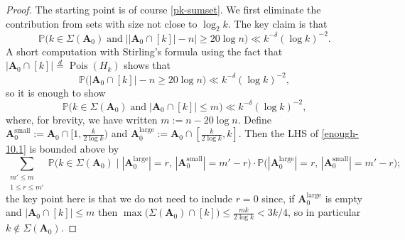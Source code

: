 \documentclass[11pt,reqno]{amsart}
\numberwithin{equation}{section}
\theoremstyle{definition}
\theoremstyle{remark}
\newcommand{\mb}{\mathbb}
\newcommand{\mbf}{\mathbf}
\newcommand\Pois{\operatorname{Pois}}
\renewcommand{\le}{\leqslant}
\renewcommand{\ge}{\geqslant}
\def\sml{\operatorname{small}}
\def\lrg{\operatorname{large}}
\newcommand\samedist{\overset{d}{=}}
\begin{document}
\begin{proof}
The starting point is of course \cref{pk-sumset}. We first eliminate the contribution from sets with size not close to $\log_2 k$. The key claim is that 
\begin{equation}\label{lemma6.1} \mb{P}\big(k \in \Sigma(\mbf{A}_0) \; \mbox{and} \; \big| |\mbf{A}_0 \cap [k]| - n\big| \ge 20 \log n \big) \ll k^{-\delta} (\log k)^{-2} .\end{equation}
A short computation with Stirling's formula using the fact that $|\mbf{A}_0 \cap [k]| \samedist \Pois(H_k)$ shows that 
\[ \mb{P}\big( |\mbf{A}_0 \cap [k]| - n  \ge 20 \log n \big) \ll k^{-\delta} (\log k)^{-2} ,\] so it is enough to show 
\begin{equation}\label{enough-10.1} \mb{P}\big(k \in \Sigma(\mbf{A}_0) \; \mbox{and} \; |\mbf{A}_0 \cap [k]| \le  m \big) \ll k^{-\delta} (\log k)^{-2},\end{equation} where, for brevity, we have written $m := n - 20 \log n$. Define $\mbf{A}_0^{\sml} := \mbf{A}_0 \cap [1,\frac{k}{2\log k})$ and $\mbf{A}_0^{\lrg} := \mbf{A}_0 \cap [\frac{k}{2\log k},k]$. Then the LHS of \cref{enough-10.1} is bounded above by
\begin{equation}\label{int-10.2} \sum_{\substack{m' \le m \\ 1 \le r \le m'}} \mb{P}\big(k \in \Sigma(\mbf{A}_0) \mid |\mbf{A}_0^{\lrg}| = r,\, |\mbf{A}_0^{\sml}| = m' - r \big) \cdot \mb{P} \big(|\mbf{A}_0^{\lrg}| = r,\, |\mbf{A}_0^{\sml}| = m' - r \big); \end{equation} the key point here is that we do not need to include $r = 0$ since, if $\mbf{A}_0^{\lrg}$ is empty and $|\mbf{A}_0 \cap [k]| \le  m$ then $\max \big(\Sigma(\mbf{A}_0) \cap [k]\big) \le \frac{mk}{2\log k} < 3k/4$, so in particular $k \notin \Sigma(\mbf{A}_0)$.


\end{proof}
\end{document}

